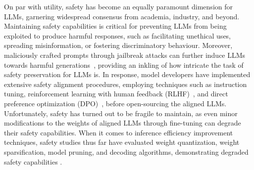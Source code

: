 
On par with utility, safety has become an equally paramount dimension for LLMs, garnering widespread consensus from academia, industry, and beyond. Maintaining safety capabilities is critical for preventing LLMs from being exploited to produce harmful responses, such as facilitating unethical uses, spreading misinformation, or fostering discriminatory behaviour. Moreover, maliciously crafted prompts through jailbreak attacks can further induce LLMs towards harmful generations~\cite{gupta2023chatgpt, singh2023exploiting, zhang2024psysafe}, providing an inkling of how intricate the task of safety preservation for LLMs is. In response, model developers have implemented extensive safety alignment procedures, employing techniques such as instruction tuning, reinforcement learning with human feedback (RLHF)~\cite{ouyang2022training, dai2023safe}, and direct preference optimization (DPO)~\cite{rafailov2024direct}, before open-sourcing the aligned LLMs. Unfortunately, safety has turned out to be fragile to maintain, as even minor modifications to the weights of aligned LLMs through fine-tuning can degrade their safety capabilities. When it comes to inference efficiency improvement techniques, safety studies thus far have evaluated weight quantization, weight sparsification, model pruning, and decoding algorithms, demonstrating degraded safety capabilities \cite{qi2023fine,hsu2024safe,jaiswal2023compressing,yin2023outlier,li2024discovering,huang2023catastrophic,huang2024trustllm}.

